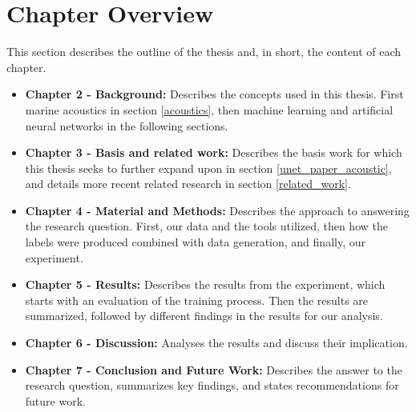 \section{Chapter Overview}
    This section describes the outline of the thesis and, in short, the content of each chapter.
    \begin{itemize}
        \item \textbf{Chapter 2 - Background: } Describes the concepts used in this thesis. First marine acoustics in section \ref{acoustics}, then machine learning and artificial neural networks in the following sections.
        \item \textbf{Chapter 3 - Basis and related work:} Describes the basis work for which this thesis seeks to further expand upon in section \ref{unet_paper_acoustic}, and details more recent related research in section \ref{related_work}.
        \item \textbf{Chapter 4 - Material and Methods:} Describes the approach to answering the research question. First, our data and the tools utilized, then how the labels were produced combined with data generation, and finally, our experiment.
        \item \textbf{Chapter 5 - Results:} Describes the results from the experiment, which starts with an evaluation of the training process. Then the results are summarized, followed by different findings in the results for our analysis. 
        \item \textbf{Chapter 6 - Discussion:}  Analyses the results and discuss their implication. 
        \item \textbf{Chapter 7 - Conclusion and Future Work:}  Describes the answer to the research question, summarizes key findings, and states recommendations for future work.
    \end{itemize}




